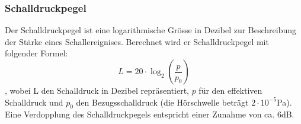 \documentclass{article}
\begin{document}
\subsubsection{Schalldruckpegel}
Der Schalldruckpegel ist eine logarithmische Grösse in Dezibel zur Beschreibung der Stärke eines Schallereignises. Berechnet wird er Schalldruckpegel mit folgender Formel: 
$$L = 20 \cdot \log_{2}( \frac{p}{p_0} )$$
, wobei L den Schalldruck in Dezibel repräsentiert, $p$ für den effektiven Schalldruck und $p_0$ den Bezugsschalldruck (die Hörschwelle beträgt $2\cdot 10^{-5}$Pa). Eine Verdopplung des Schalldruckpegels entspricht einer Zunahme von ca. 6dB.
\end{document}
